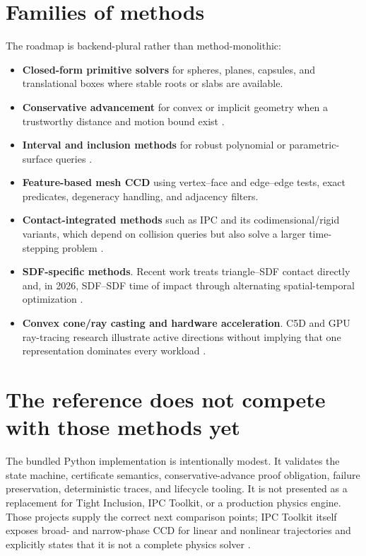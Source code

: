 \documentclass[11pt,a4paper,openany]{book}
\begin{document}
\section{Families of methods}
The roadmap is backend-plural rather than method-monolithic:
\begin{itemize}
  \item \textbf{Closed-form primitive solvers} for spheres, planes, capsules, and translational boxes where stable roots or slabs are available.
  \item \textbf{Conservative advancement} for convex or implicit geometry when a trustworthy distance and motion bound exist \citep{mirtich1996,zhang2006}.
  \item \textbf{Interval and inclusion methods} for robust polynomial or parametric-surface queries \citep{wang2021tight,chen2024tdibm}.
  \item \textbf{Feature-based mesh CCD} using vertex--face and edge--edge tests, exact predicates, degeneracy handling, and adjacency filters.
  \item \textbf{Contact-integrated methods} such as IPC and its codimensional/rigid variants, which depend on collision queries but also solve a larger time-stepping problem \citep{li2021cipc,ferguson2021rigidipc}.
  \item \textbf{SDF-specific methods}. Recent work treats triangle--SDF contact directly and, in 2026, SDF--SDF time of impact through alternating spatial-temporal optimization \citep{pelletier2025trisdf,nielsen2026sdfsdf}.
  \item \textbf{Convex cone/ray casting and hardware acceleration}. C5D and GPU ray-tracing research illustrate active directions without implying that one representation dominates every workload \citep{yuan2025c5d,sui2024rtccd}.
\end{itemize}

\section{The reference does not compete with those methods yet}
The bundled Python implementation is intentionally modest. It validates the state machine, certificate semantics, conservative-advance proof obligation, failure preservation, deterministic traces, and lifecycle tooling. It is not presented as a replacement for Tight Inclusion, IPC Toolkit, or a production physics engine. Those projects supply the correct next comparison points; IPC Toolkit itself exposes broad- and narrow-phase CCD for linear and nonlinear trajectories and explicitly states that it is not a complete physics solver \citep{ipctoolkit}.
\end{document}
